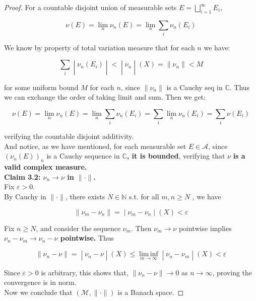 \begin{proof}
For a countable disjoint union of measurable sets \(E = \bigsqcup_{i = 1}^{\infty}E_{i}\),

\[\nu(E) = \lim\limits_{n}\nu_{n}(E) = \lim\limits_{n}\sum\limits_{i}\nu_{n}(E_{i})\]

We know by property of total variation measure that for each \(n\) we have:

\[\left. \sum\limits_{i} \middle| \nu_{n}(E_{i}) \middle| < \middle| \nu_{n} \middle| (X) = \parallel \nu_{n} \parallel < M \right.\]

for some uniform bound \(M\) for each \(n\), since \(\parallel \nu_{n} \parallel\) is a Cauchy seq in \(\mathbb{C}\). Thus we can exchange the order of taking limit and sum. Then we get:

\[\nu(E) = \lim\limits_{n}\nu_{n}(E) = \lim\limits_{n}\sum\limits_{i}\nu_{n}(E_{i}) = \sum\limits_{i}\lim\limits_{n}\nu_{n}(E_{i}) = \sum\limits_{i}\nu(E_{i})\]

verifying the countable disjoint additivity.\\
And notice, as we have mentioned, for each measurable set \(E \in \mathcal{A}\), since \((\nu_{n}(E))_{n}\) is a Cauchy sequence in \(\mathbb{C}\)\textbf{, it is bounded}, verifying that \(\nu\) \textbf{is a valid complex measure.}\\
\textbf{Claim 3.2: \(\nu_{n}\rightarrow\nu\) in \(\parallel \cdot \parallel\).}\\
Fix \(\varepsilon > 0\).\\
By Cauchy in \(\parallel \cdot \parallel\), there exists \(N \in \mathbb{N}\) s.t. for all \(m,n \geq N\) , we have

\[\left. \parallel \nu_{m} - \nu_{n} \parallel = \middle| \nu_{m} - \nu_{n} \middle| (X) < \varepsilon \right.\]

Fix \(n \geq N\), and consider the sequence \(\nu_{m}\). Then \(\nu_{m}\rightarrow\nu\) pointwise implies \textbf{\(\nu_{n} - \nu_{m}\rightarrow\nu_{n} - \nu\) pointwise.} Thus

\[\left. \parallel \nu_{n} - \nu \parallel = \middle| \nu_{n} - \nu \middle| (X) \leq \operatorname{lim\, inf}\limits_{m\rightarrow\infty} \middle| \nu_{n} - \nu_{m} \middle| (X) < \varepsilon \right.\]

Since \(\varepsilon > 0\) is arbitrary, this shows that, \(\parallel \nu_{n} - \nu \parallel \rightarrow 0\) as \(n\rightarrow\infty\), proving the convergence is in norm.\\
Now we conclude that \((\mathcal{M}, \parallel \cdot \parallel )\) is a Banach space.

\end{proof}

